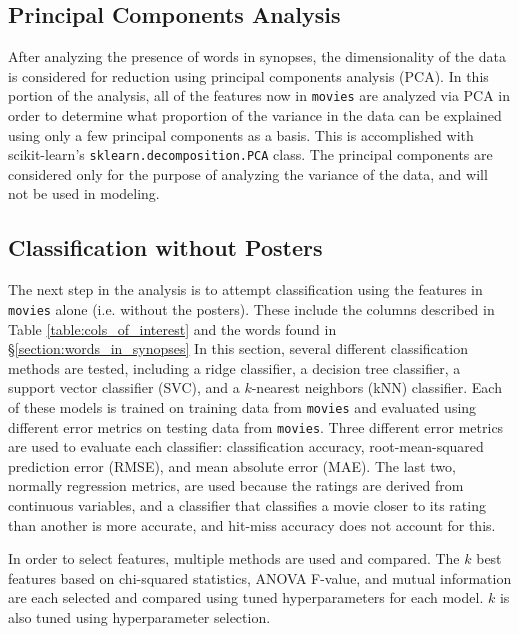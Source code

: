 \documentclass[12pt, oneside]{article}   	%
\begin{document}
\subsection{Principal Components Analysis}
\label{section:pca}

After analyzing the presence of words in synopses, the dimensionality of the data is considered for reduction using principal components analysis (PCA). In this portion of the analysis, all of the features now in \texttt{movies} are analyzed via PCA in order to determine what proportion of the variance in the data can be explained using only a few principal components as a basis. This is accomplished with scikit-learn's \texttt{sklearn.decomposition.PCA} class. The principal components are considered only for the purpose of analyzing the variance of the data, and will not be used in modeling.

\subsection{Classification without Posters}
\label{section:class_no_posters}

The next step in the analysis is to attempt classification using the features in \texttt{movies} alone (i.e. without the posters). These include the columns described in Table \ref{table:cols_of_interest} and the words found in \S \ref{section:words_in_synopses} In this section, several different classification methods are tested, including a ridge classifier, a decision tree classifier, a support vector classifier (SVC), and a $k$-nearest neighbors (kNN) classifier. Each of these models is trained on training data from \texttt{movies} and evaluated using different error metrics on testing data from \texttt{movies}. Three different error metrics are used to evaluate each classifier: classification accuracy, root-mean-squared prediction error (RMSE), and mean absolute error (MAE). The last two, normally regression metrics, are used because the ratings are derived from continuous variables, and a classifier that classifies a movie closer to its rating than another is more accurate, and hit-miss accuracy does not account for this.

In order to select features, multiple methods are used and compared. The $k$ best features based on chi-squared statistics, ANOVA F-value, and mutual information are each selected and compared using tuned hyperparameters for each model. $k$ is also tuned using hyperparameter selection.
\end{document}
